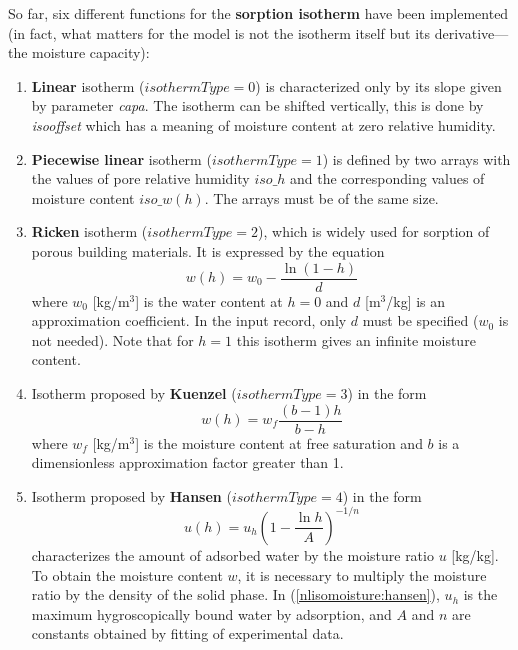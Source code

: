 \documentclass[a4paper]{article}
\begin{document}
So far, six different functions for the {\bf sorption
isotherm} have been implemented  (in fact, what matters for the model
is not the isotherm itself but its derivative---the moisture capacity):
\begin{enumerate}

\item
{\bf Linear} isotherm ($isothermType=0$) is characterized only by its
slope given by parameter \emph{capa}. The isotherm can be
shifted vertically, this is done by \emph{isooffset} which has a
meaning of moisture content at zero relative humidity.

\item
{\bf Piecewise linear} isotherm ($isothermType=1$) is defined by two 
arrays
with the values of pore relative humidity $iso\_h$ and the
corresponding values of moisture content $iso\_w(h)$. The arrays must be of
the same size. 

\item
{\bf Ricken} isotherm \cite{Kuenzel}
($isothermType=2$), which is widely used for sorption of porous building
materials. It is
expressed by the equation
\begin{equation}\label{nlisomoisture:ricken}
w(h) = w_0 - \frac{\ln(1-h)}{d}
\end{equation} 
where $w_0$ [kg/m$^3$] is the water content at $h=0$ and $d$ [m$^3$/kg] is
an approximation coefficient. In the input record, only $d$ must be specified 
($w_0$ is not needed). Note that for $h=1$ this isotherm
gives an infinite moisture content. 

\item
Isotherm proposed by {\bf Kuenzel} \cite{Kuenzel} ($isothermType=3$) 
in the form 
\begin{equation}\label{nlisomoisture:kuenzel}
w(h) = w_f \frac{(b-1)h}{b-h}
\end{equation} 
where $w_f$ [kg/m$^3$] is the moisture content at free saturation and
$b$ is a dimensionless approximation factor greater than 1.

\item
Isotherm proposed by {\bf Hansen} \cite{Hansen} ($isothermType=4$) in the form
\begin{equation}\label{nlisomoisture:hansen}
u(h) = u_h \left(1- \frac{\ln h}{A} \right)^{-1/n}
\end{equation} 
characterizes the amount of adsorbed water 
by the moisture ratio $u$ [kg/kg]. To obtain the
moisture content $w$, it is necessary to multiply the moisture ratio
by the density of the solid phase. In (\ref{nlisomoisture:hansen}),
 $u_h$ is the maximum hygroscopically
bound water by adsorption, and $A$ and $n$ are constants
obtained by fitting of experimental data.


\end{enumerate}
\end{document}

